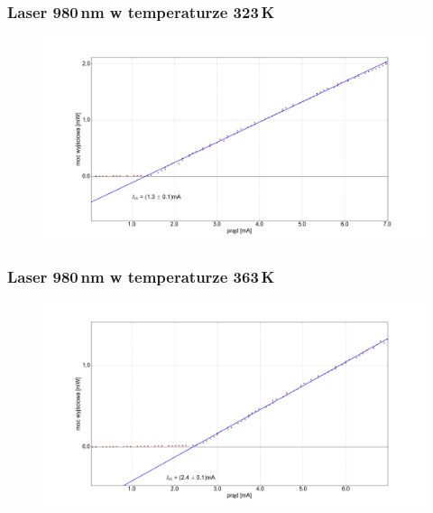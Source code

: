 \documentclass[xcolor={dvipsnames,table}]{beamer}
\begin{document}
\begin{frame}
\frametitle{Laser 980\,nm w temperaturze 323\,K}
\center
\begin{figure}
   \includegraphics[width=1.10\textwidth,natwidth=69,natheight=87]{temp_50_fit.png}
\end{figure}
\end{frame}

\begin{frame}
\frametitle{Laser 980\,nm w temperaturze 363\,K}
\center
\begin{figure}
   \includegraphics[width=1.10\textwidth,natwidth=69,natheight=87]{temp_90_fit.png}
\end{figure}
\end{frame}
\end{document}
